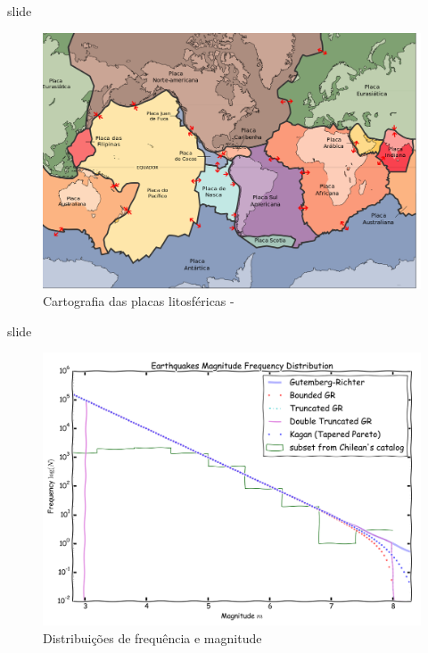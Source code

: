 \documentclass[ucs,8pt]{beamer}
\begin{document}
\begin{frame}{slide}

\begin{figure}[H]
   \centering
   \includegraphics[height=0.95\textheight]{litho_plates_overview}
   \caption[Cartografia das placas litosféricas]
   		   {Cartografia das placas litosféricas - \citet{usgs_plates_1996}} 
   \label{f:plates_overview}
\end{figure} 

\end{frame}




\begin{frame}{slide}

\begin{figure}[H]
   \centering
   \includegraphics[height=0.95\textheight]{mfd}
   \caption[Distribuições de frequência e magnitude]
   		   {Distribuições de frequência e magnitude} 
   \label{f:mfd}
\end{figure} 

\end{frame}
\end{document}
